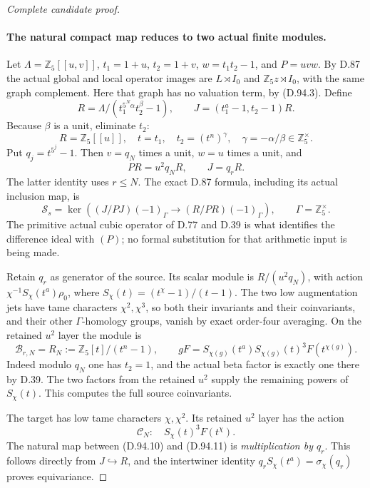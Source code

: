 \begin{proof}[Complete candidate proof]
\paragraph{The natural compact map reduces to two actual finite modules.}
Let \(\Lambda=\mathbb Z_5[[u,v]]\), \(t_1=1+u\),
\(t_2=1+v\), \(w=t_1t_2-1\), and \(P=uvw\).
By D.87 the actual global and local operator images are
\(L\rtimes I_0\) and \(\mathbb Z_5z\rtimes I_0\), with the
same graph complement. Here that graph has no valuation term,
by (D.94.3). Define
\[
 R=\Lambda/(t_1^{5^N\alpha}t_2^\beta-1),\qquad
 J=(t_1^a-1,t_2-1)R.
                                                        \tag{D.94.6}
\]
Because \(\beta\) is a unit, eliminate \(t_2\):
\[
 R=\mathbb Z_5[[u]],\quad t=t_1,\quad
 t_2=(t^n)^\gamma,\quad \gamma=-\alpha/\beta\in\mathbb Z_5^\times.
                                                        \tag{D.94.7}
\]
Put \(q_j=t^{5^j}-1\). Then \(v=q_N\) times a unit,
\(w=u\) times a unit, and
\[
                 PR=u^2q_NR,\qquad J=q_rR.             \tag{D.94.8}
\]
The latter identity uses \(r\le N\). The exact D.87 formula,
including its actual inclusion map, is
\[
 \mathcal S_s=
 \ker\left((J/PJ)(-1)_\Gamma\longrightarrow
                   (R/PR)(-1)_\Gamma\right),
                 \qquad\Gamma=\mathbb Z_5^\times.       \tag{D.94.9}
\]
The primitive actual cubic operator of D.77 and D.39 is what
identifies the difference ideal with \((P)\); no formal
substitution for that arithmetic input is being made.

Retain \(q_r\) as generator of the source. Its scalar module
is \(R/(u^2q_N)\), with action
\(\chi^{-1}S_\chi(t^a)\rho_0\), where
\(S_\chi(t)=(t^\chi-1)/(t-1)\). The two low augmentation
jets have tame characters \(\chi^2,\chi^3\), so both their
invariants and their coinvariants, and their other
\(\Gamma\)-homology groups, vanish by exact order-four
averaging. On the retained \(u^2\) layer the module is
\[
 \mathscr B_{r,N}=R_N:=\mathbb Z_5[t]/(t^n-1),\qquad
       gF=S_{\chi(g)}(t^a)S_{\chi(g)}(t)^3F(t^{\chi(g)}).
                                                        \tag{D.94.10}
\]
Indeed modulo \(q_N\) one has \(t_2=1\), and the actual
beta factor is exactly one there by D.39. The two factors
from the retained \(u^2\) supply the remaining powers of
\(S_\chi(t)\). This computes the full source coinvariants.

The target has low tame characters \(\chi,\chi^2\).
Its retained \(u^2\) layer has the action
\[
          \mathscr C_N:\quad S_\chi(t)^3F(t^\chi).
                                                        \tag{D.94.11}
\]
The natural map between (D.94.10) and (D.94.11) is
\emph{multiplication by \(q_r\)}. This follows directly
from \(J\hookrightarrow R\), and the intertwiner identity
\(q_rS_\chi(t^a)=\sigma_\chi(q_r)\) proves equivariance.


\end{proof}
